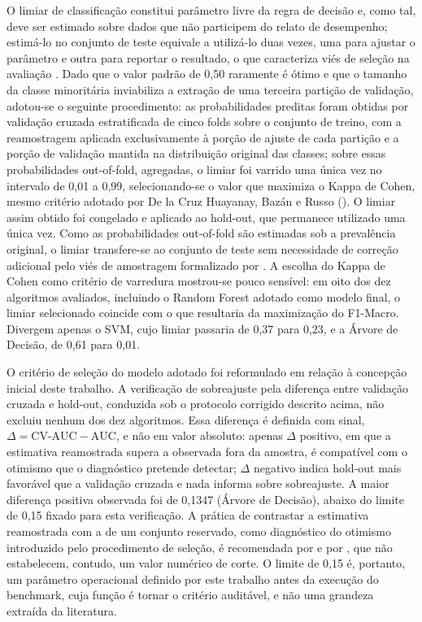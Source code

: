O limiar de classificação constitui parâmetro livre da regra de decisão e, como tal, deve ser estimado sobre dados que não participem do relato de desempenho; estimá-lo no conjunto de teste equivale a utilizá-lo duas vezes, uma para ajustar o parâmetro e outra para reportar o resultado, o que caracteriza viés de seleção na avaliação \cite{cawley2010,hastie2009}. Dado que o valor padrão de 0,50 raramente é ótimo \cite{fawcett2006} e que o tamanho da classe minoritária inviabiliza a extração de uma terceira partição de validação, adotou-se o seguinte procedimento: as probabilidades preditas foram obtidas por validação cruzada estratificada de cinco folds sobre o conjunto de treino, com a reamostragem aplicada exclusivamente à porção de ajuste de cada partição e a porção de validação mantida na distribuição original das classes; sobre essas probabilidades out-of-fold, agregadas, o limiar foi varrido uma única vez no intervalo de 0,01 a 0,99, selecionando-se o valor que maximiza o Kappa de Cohen, mesmo critério adotado por De la Cruz Huayanay, Bazán e Russo (\citeyear{delacruz2025}). O limiar assim obtido foi congelado e aplicado ao hold-out, que permanece utilizado uma única vez. Como as probabilidades out-of-fold são estimadas sob a prevalência original, o limiar transfere-se ao conjunto de teste sem necessidade de correção adicional pelo viés de amostragem formalizado por . A escolha do Kappa de Cohen como critério de varredura mostrou-se pouco sensível: em oito dos dez algoritmos avaliados, incluindo o Random Forest adotado como modelo final, o limiar selecionado coincide com o que resultaria da maximização do F1-Macro. Divergem apenas o SVM, cujo limiar passaria de 0,37 para 0,23, e a Árvore de Decisão, de 0,61 para 0,01.

O critério de seleção do modelo adotado foi reformulado em relação à concepção inicial deste trabalho. A verificação de sobreajuste pela diferença entre validação cruzada e hold-out, conduzida sob o protocolo corrigido descrito acima, não excluiu nenhum dos dez algoritmos. Essa diferença é definida com sinal, $\Delta = \textrm{CV-AUC} - \textrm{AUC}$, e não em valor absoluto: apenas $\Delta$ positivo, em que a estimativa reamostrada supera a observada fora da amostra, é compatível com o otimismo que o diagnóstico pretende detectar; $\Delta$ negativo indica hold-out mais favorável que a validação cruzada e nada informa sobre sobreajuste. A maior diferença positiva observada foi de 0,1347 (Árvore de Decisão), abaixo do limite de 0,15 fixado para esta verificação. A prática de contrastar a estimativa reamostrada com a de um conjunto reservado, como diagnóstico do otimismo introduzido pelo procedimento de seleção, é recomendada por  e por , que não estabelecem, contudo, um valor numérico de corte. O limite de 0,15 é, portanto, um parâmetro operacional definido por este trabalho antes da execução do benchmark, cuja função é tornar o critério auditável, e não uma grandeza extraída da literatura.

